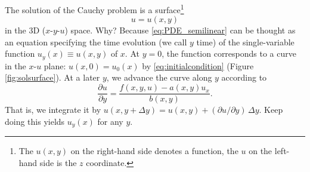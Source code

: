 \documentclass{article}
\begin{document}
The solution of the Cauchy problem is a surface\footnote{
The $u(x, y)$ on the right-hand side denotes a function,
the $u$ on the left-hand side is the $z$ coordinate.
}
$$
u = u(x, y)
$$
in the 3D ($x$-$y$-$u$) space.
Why? Because \eqref{eq:PDE_semilinear}
can be thought as an equation specifying the time evolution
(we call $y$ time)
of the single-variable function $u_y(x) \equiv u(x, y)$ of $x$.
At $y = 0$, the function corresponds to a curve in the $x$-$u$ plane:
$u(x, 0) = u_0(x)$ by \eqref{eq:initialcondition}
(Figure \ref{fig:solsurface}).
%
At a later $y$, we advance the curve along $y$
according to
$$
\frac{\partial u} {\partial y}
= \frac{ f(x, y, u) - a(x, y) u_x} { b(x, y) }.
$$
That is, we integrate it by
$u(x, y+\Delta y) = u(x, y) + (\partial u/\partial y) \, \Delta y$.
Keep doing this yields $u_y(x)$ for any $y$.
\end{document}

